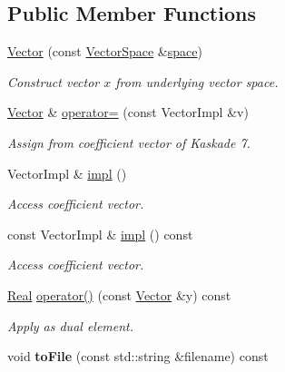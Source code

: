 \subsection*{Public Member Functions}
\begin{DoxyCompactItemize}
\item 
\hyperlink{classSpacy_1_1Kaskade_1_1Vector_a50fa434e8ca78baa9660e756eba6cfe9_a50fa434e8ca78baa9660e756eba6cfe9}{Vector} (const \hyperlink{classSpacy_1_1VectorSpace}{Vector\+Space} \&\hyperlink{classSpacy_1_1VectorBase_a95e87ce98f5a7646055d4e87e6024044_a95e87ce98f5a7646055d4e87e6024044}{space})
\begin{DoxyCompactList}\small\item\em Construct vector $x$ from underlying vector space. \end{DoxyCompactList}\item 
\hyperlink{classSpacy_1_1Kaskade_1_1Vector}{Vector} \& \hyperlink{classSpacy_1_1Kaskade_1_1Vector_a113165c42f695541efd4b21389667888_a113165c42f695541efd4b21389667888}{operator=} (const Vector\+Impl \&v)
\begin{DoxyCompactList}\small\item\em Assign from coefficient vector of Kaskade 7. \end{DoxyCompactList}\item 
Vector\+Impl \& \hyperlink{classSpacy_1_1Kaskade_1_1Vector_a017823a6ffb586c1feb188e863eae415_a017823a6ffb586c1feb188e863eae415}{impl} ()
\begin{DoxyCompactList}\small\item\em Access coefficient vector. \end{DoxyCompactList}\item 
const Vector\+Impl \& \hyperlink{classSpacy_1_1Kaskade_1_1Vector_a57f5a4650a1d2468a67eeec48e97f475_a57f5a4650a1d2468a67eeec48e97f475}{impl} () const 
\begin{DoxyCompactList}\small\item\em Access coefficient vector. \end{DoxyCompactList}\item 
\hyperlink{classSpacy_1_1Real}{Real} \hyperlink{classSpacy_1_1Kaskade_1_1Vector_afcc468febdc597347dfdab956bdca9bd_afcc468febdc597347dfdab956bdca9bd}{operator()} (const \hyperlink{classSpacy_1_1Kaskade_1_1Vector}{Vector} \&y) const 
\begin{DoxyCompactList}\small\item\em Apply as dual element. \end{DoxyCompactList}\item 
\hypertarget{classSpacy_1_1Kaskade_1_1Vector_ad61e6bf74180d7ca3d418f8390f68289}{}void {\bfseries to\+File} (const std\+::string \&filename) const \label{classSpacy_1_1Kaskade_1_1Vector_ad61e6bf74180d7ca3d418f8390f68289}


\end{DoxyCompactItemize}
